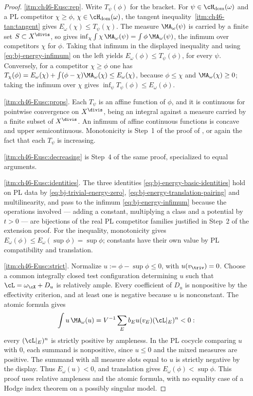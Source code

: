 \begin{proof}
\cref{itm:ch46-Eusc:rep}.  Write $T_\psi(\phi)$ for the bracket.  For
$\psi\in\cH_{\mathrm{dom}}(\omega)$ and a PL competitor
$\chi\ge\phi$, $\chi\in\cH_{\mathrm{dom}}(\omega)$, the tangent
inequality \,\cref{itm:ch46-tan:tangent} gives
$E_\omega(\chi)\le T_\psi(\chi)$.  The measure
$\MA_\omega(\psi)$ is carried by a finite set
$S\subset X^{\divis}$, so
 gives
$\inf_\chi\int\chi\,\MA_\omega(\psi)=\int\phi\,\MA_\omega(\psi)$, the
infimum over competitors $\chi$ for $\phi$.  Taking that infimum in the
displayed inequality and using \eqref{eq:bj-energy-infimum} on the left
yields $E_\omega(\phi)\le T_\psi(\phi)$, for every $\psi$.  Conversely,
for a competitor $\chi\ge\phi$ one has
$T_\chi(\phi)=E_\omega(\chi)+\int(\phi-\chi)\MA_\omega(\chi)
\le E_\omega(\chi)$, because $\phi\le\chi$ and $\MA_\omega(\chi)\ge0$;
taking the infimum over $\chi$ gives
$\inf_\psi T_\psi(\phi)\le E_\omega(\phi)$.

\cref{itm:ch46-Eusc:props}.  Each $T_\psi$ is an affine function of
$\phi$, and it is continuous for pointwise convergence on
$X^{\divis}$, being an integral against a measure carried by a finite
subset of $X^{\divis}$.  An infimum of affine continuous functions is
concave and upper semicontinuous.  Monotonicity is Step~1 of the proof of
, or again the fact that each
$T_\psi$ is increasing.

\cref{itm:ch46-Eusc:decreasing} is Step~4 of the same proof, specialized to
equal arguments.

\cref{itm:ch46-Eusc:identities}.  The three identities
\eqref{eq:bj-energy-basic-identities} hold on PL data by
\eqref{eq:bj-trivial-energy-zero},
\eqref{eq:bj-energy-translation-pairing} and multilinearity, and pass to
the infimum \eqref{eq:bj-energy-infimum} because the operations involved
--- adding a constant, multiplying a class and a potential by $t>0$ ---
are bijections of the real PL competitor families justified in Step~2
of the extension proof. For the inequality, monotonicity gives
$E_\omega(\phi)\le E_\omega(\sup\phi)=\sup\phi$;
constants have their own value by PL compatibility and translation.

\cref{itm:ch46-Eusc:strict}.
Normalize $u:=\phi-\sup\phi\le0$, with $u(v_{\triv})=0$.
Choose a common integrally closed test configuration determining $u$
such that $\cL=\omega_{\cX}+D_u$ is relatively ample. Every coefficient
of $D_u$ is nonpositive by the effectivity criterion, and at least one
is negative because $u$ is nonconstant. The atomic formula gives
\[
 \int u\,\MA_\omega(u)
 =V^{-1}\sum_E b_Eu(v_E)(\cL|_E)^n<0:
\]
every $(\cL|_E)^n$ is strictly positive by ampleness.
In the PL cocycle comparing $u$ with $0$, each summand is nonpositive,
since $u\le0$ and the mixed measures are positive. The summand with all
measure slots equal to $u$ is strictly negative by the display.
Thus $E_\omega(u)<0$, and translation gives
$E_\omega(\phi)<\sup\phi$. This proof uses relative ampleness and the
atomic formula, with no equality case of a Hodge index theorem on a
possibly singular model.
\end{proof}

